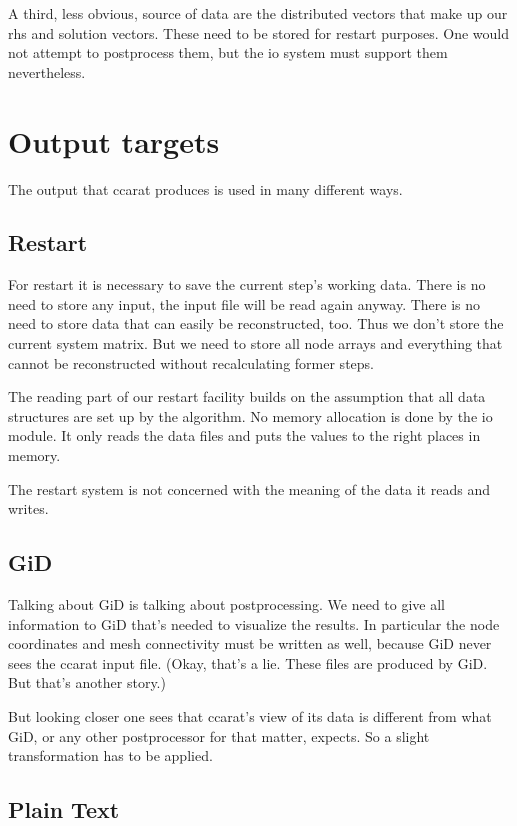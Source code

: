 A third, less obvious, source of data are the distributed vectors
that make up our rhs and solution vectors. These need to be stored
for restart purposes. One would not attempt to postprocess them, but
the io system must support them nevertheless.


\section{Output targets}

The output that ccarat produces is used in many different ways.


\subsection{Restart}

For restart it is necessary to save the current step's working data.
There is no need to store any input, the input file will be read again
anyway. There is no need to store data that can easily be reconstructed,
too. Thus we don't store the current system matrix. But we need to
store all node arrays and everything that cannot be reconstructed
without recalculating former steps.

The reading part of our restart facility builds on the assumption
that all data structures are set up by the algorithm. No memory allocation
is done by the io module. It only reads the data files and puts the
values to the right places in memory.

The restart system is not concerned with the meaning of the data it
reads and writes.


\subsection{GiD}

Talking about GiD is talking about postprocessing. We need to give
all information to GiD that's needed to visualize the results. In
particular the node coordinates and mesh connectivity must be written
as well, because GiD never sees the ccarat input file. (Okay, that's
a lie. These files are produced by GiD. But that's another story.)

But looking closer one sees that ccarat's view of its data is different
from what GiD, or any other postprocessor for that matter, expects.
So a slight transformation has to be applied.


\subsection{Plain Text}

